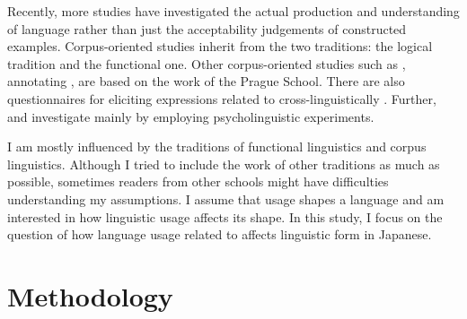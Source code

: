 Recently, more studies have investigated the actual production and understanding of language rather than just the acceptability judgements of constructed examples.
Corpus-oriented studies  
\cite[e.g.,][]{calhounetal05,gotzeetal07,chiarcosetal11}
inherit from the two  traditions:
the logical tradition and the functional one.
Other corpus-oriented studies such as ,
annotating , are based on the work of the Prague School.
There are also questionnaires for eliciting expressions related to  cross-linguistically \cite{skopeteasetal06}. Further, 
 and  investigate  mainly by employing psycholinguistic experiments.

I am mostly influenced by the traditions of functional linguistics and corpus linguistics.
Although I tried to include the work of other traditions as much as possible, sometimes readers from other schools might have difficulties understanding my assumptions.
I assume that usage shapes a language \cite{givon76,comrie83,comrie89,bybeehopper01} and
am interested in how linguistic usage affects its shape. %
In this study,
I focus on the question of how language usage related to  affects linguistic form in Japanese.


\section{Methodology}\label{IntroMethodology}

